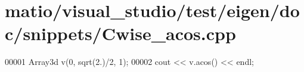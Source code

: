 \hypertarget{matio_2visual__studio_2test_2eigen_2doc_2snippets_2_cwise__acos_8cpp_source}{}\section{matio/visual\+\_\+studio/test/eigen/doc/snippets/\+Cwise\+\_\+acos.cpp}
\label{matio_2visual__studio_2test_2eigen_2doc_2snippets_2_cwise__acos_8cpp_source}

\begin{DoxyCode}
00001 Array3d v(0, sqrt(2.)/2, 1);
00002 cout << v.acos() << endl;
\end{DoxyCode}
